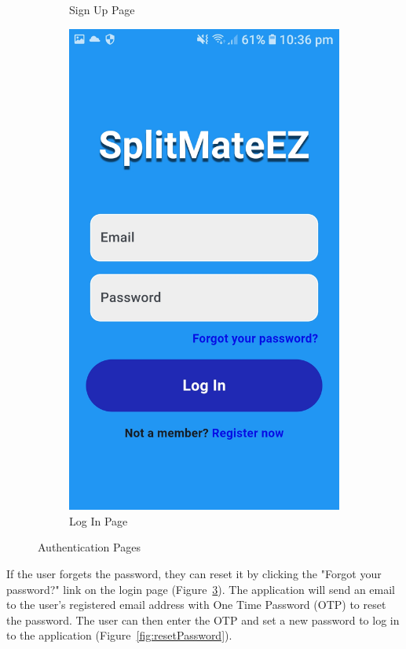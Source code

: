 \documentclass[sigconf,nonacm]{acmart}\settopmatter{printfolios=true}
\begin{document}
\begin{figure}[htbp]
\begin{subfigure}{0.24\textwidth}
    \caption{Sign Up Page}
    \label{fig:signUp}
  \end{subfigure}
  \begin{subfigure}{0.24\textwidth}
    \raggedleft
    \includegraphics[width=\linewidth]{logIn.jpg}
    \caption{Log In Page}
    \label{fig:logIn}
  \end{subfigure}
  \caption{Authentication Pages}
\end{figure}

If the user forgets the password, they can reset it by clicking the "Forgot your password?" link on the login page (Figure~\ref{fig:logIn}). The application will send an email to the user's registered email address with One Time Password (OTP) to reset the password. The user can then enter the OTP and set a new password to log in to the application (Figure~\ref{fig:resetPassword}).
\end{document}
